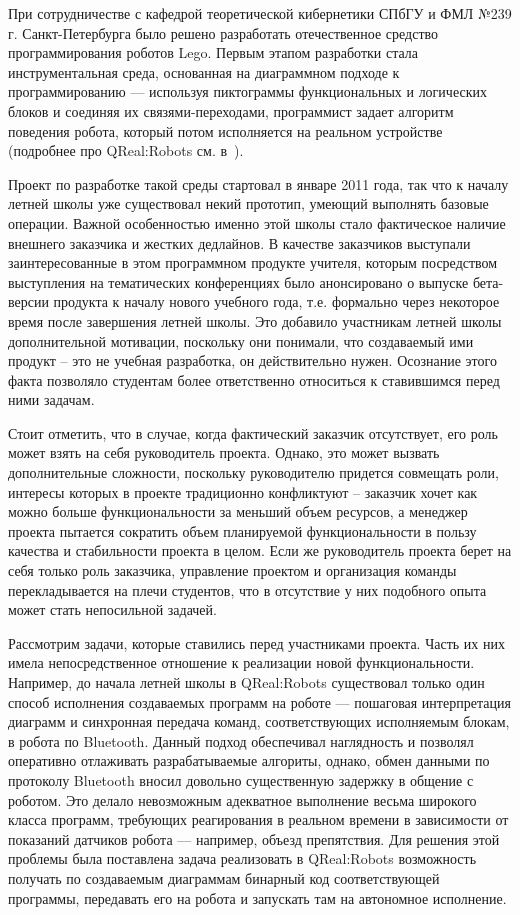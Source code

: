 \documentclass[a4paper]{article}
\begin{document}
При сотрудничестве с кафедрой теоретической кибернетики СПбГУ и ФМЛ №239 г. Санкт-Петербурга было решено разработать отечественное средство программирования роботов Lego. Первым этапом разработки стала инструментальная среда, основанная на диаграммном подходе к программированию --- используя пиктограммы функциональных и логических блоков и соединяя их связями-переходами, программист задает алгоритм поведения робота, который потом исполняется на реальном устройстве (подробнее про QReal:Robots см. в~\cite{robots}).

Проект по разработке такой среды стартовал в январе 2011 года, так что к началу летней школы уже существовал некий прототип, умеющий выполнять базовые операции. Важной особенностью именно этой школы стало фактическое наличие внешнего заказчика и жестких дедлайнов. В качестве заказчиков выступали заинтересованные в этом программном продукте учителя, которым посредством выступления на тематических конференциях было анонсировано о выпуске бета-версии продукта к началу нового учебного года, т.е. формально через некоторое время после завершения летней школы. Это добавило участникам летней школы дополнительной мотивации, поскольку они понимали, что создаваемый ими продукт -- это не учебная разработка, он действительно нужен. Осознание этого факта позволяло студентам более ответственно относиться к ставившимся перед ними задачам. 

Стоит отметить, что в случае, когда фактический заказчик отсутствует, его роль может взять на себя руководитель проекта. Однако, это может вызвать дополнительные сложности, поскольку руководителю придется совмещать роли, интересы которых в проекте традиционно конфликтуют -- заказчик хочет как можно больше функциональности за меньший объем ресурсов, а менеджер проекта пытается сократить объем планируемой функциональности в пользу качества и стабильности проекта в целом. Если же руководитель проекта берет на себя только роль заказчика, управление проектом и организация команды перекладывается на плечи студентов, что в отсутствие у них подобного опыта может стать непосильной задачей.

Рассмотрим задачи, которые ставились перед участниками проекта. Часть их них имела непосредственное отношение к реализации новой функциональности. Например, до начала летней школы в QReal:Robots существовал только один способ исполнения создаваемых программ на роботе --- пошаговая интерпретация диаграмм и синхронная передача команд, соответствующих исполняемым блокам, в робота по Bluetooth. Данный подход обеспечивал наглядность и позволял оперативно отлаживать разрабатываемые алгориты, однако, обмен данными по протоколу Bluetooth вносил довольно существенную задержку в общение с роботом. Это делало невозможным адекватное выполнение весьма широкого класса программ, требующих реагирования в реальном времени в зависимости от показаний датчиков робота --- например, объезд препятствия. Для решения этой проблемы была поставлена задача реализовать в QReal:Robots возможность получать по создаваемым диаграммам бинарный код соответствующей программы, передавать его на робота и запускать там на автономное исполнение.
\end{document}
